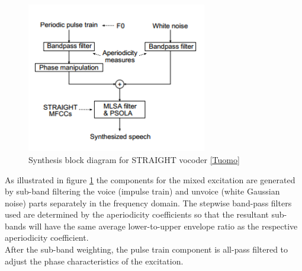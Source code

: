 \begin{figure}[!htb]
	\begin{center}
	\includegraphics[width=0.7\textwidth]{img/ssynb.png}
	\end{center}
	\caption{\label{ssynb}Synthesis block diagram for STRAIGHT vocoder \ref{Tuomo}}
\end{figure}
As illustrated in figure \ref{ssynb} the components for the mixed excitation are generated by sub-band filtering the voice (impulse train) and unvoice (white Gaussian noise) parts separately in the frequency domain. The stepwise band-pass filters used are determined by the aperiodicity coefficients so that the resultant sub-bands will have the same average lower-to-upper envelope ratio as the respective aperiodicity coefficient.\\
After the sub-band weighting, the pulse train component is all-pass filtered to adjust the phase characteristics of the excitation.
